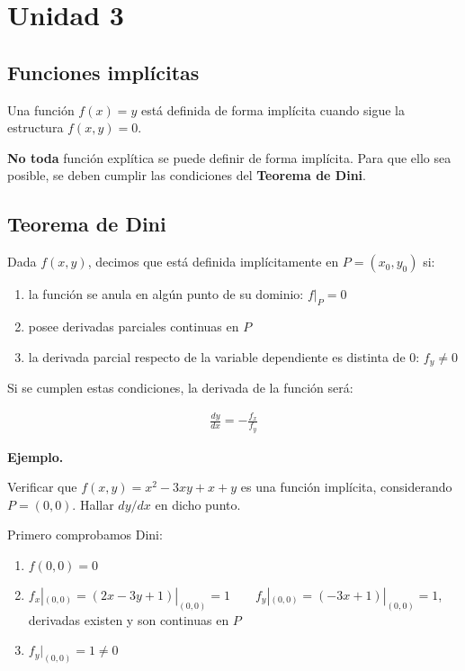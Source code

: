 \section{Unidad 3}

\subsection{Funciones implícitas}

Una función \(f(x) = y\) está definida de forma implícita cuando sigue la
estructura \(f(x,y) = 0\).

\textbf{No toda} función explítica se puede definir de forma implícita.
Para que ello sea posible,
se deben cumplir las condiciones del \textbf{Teorema de Dini}.

\subsection{Teorema de Dini}

Dada \(f(x,y)\),
decimos que está definida implícitamente en \(P = (x_0,y_0)\) si:
\begin{enumerate}
    \item la función se anula en algún punto de su dominio: \(f|_P = 0\)
    \item posee derivadas parciales continuas en \(P\)
    \item la derivada parcial respecto de la variable dependiente es distinta
          de 0: \(f_y \neq 0\)
\end{enumerate}

Si se cumplen estas condiciones,
la derivada de la función será:

\begin{align*}
    \frac{dy}{dx} = -\frac{f_x}{f_y}
\end{align*}

\vspace{.5cm}
\textbf{Ejemplo.}

Verificar que \(f(x,y) = x^{2} - 3xy + x + y\) es una función implícita,
considerando \(P = (0,0)\).
Hallar \(dy/dx\) en dicho punto.

Primero comprobamos Dini:
\begin{enumerate}
    \item \(f(0,0) = 0\)
    \item \(f_x|_{(0,0)} = (2x - 3y + 1)|_{(0,0)} = \boxed{1} \qquad f_y|_{(0,0)} = (-3x + 1)|_{(0,0)} = \boxed{1}\),
          derivadas existen y son continuas en \(P\)
    \item \(f_y|_{(0,0)} = 1 \neq 0\)
\end{enumerate}

